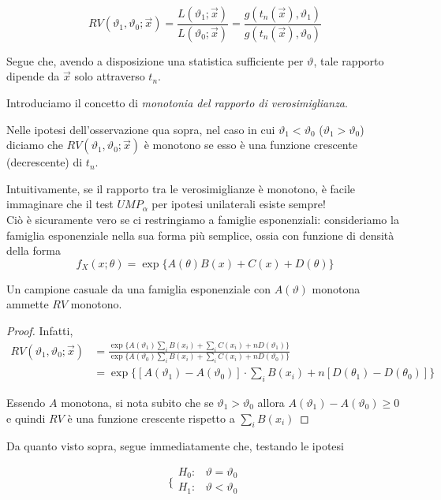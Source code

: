 $$RV(\vartheta_1,\vartheta_0; \vec{x}) = \frac{L(\vartheta_1;\vec{x})}{L(\vartheta_0;\vec{x})} = \frac{g(t_n(\vec{x}), \vartheta_1)}{g(t_n(\vec{x}), \vartheta_0)}$$

Segue che, avendo a disposizione una statistica sufficiente per $\vartheta$, tale rapporto dipende da $\vec{x}$ solo attraverso $t_n$.

Introduciamo il concetto di \textit{monotonia del rapporto di verosimiglianza}.

\begin{definizione}
Nelle ipotesi dell'osservazione qua sopra, nel caso in cui $\vartheta_1 < \vartheta_0$ ($\vartheta_1 > \vartheta_0$) diciamo che $RV(\vartheta_1,\vartheta_0; \vec{x})$ è monotono se esso è una funzione crescente (decrescente) di $t_n$. 
\end{definizione}

Intuitivamente, se il rapporto tra le verosimiglianze è monotono, è facile immaginare che il test $UMP_\alpha$ per ipotesi unilaterali esiste sempre!
\\
Ciò è sicuramente vero se ci restringiamo a famiglie esponenziali:
consideriamo la famiglia esponenziale nella sua forma più semplice, ossia con funzione di densità della forma
$$f_X(x;\theta) = \exp \{ A(\theta) B (x) +  C(x) +  D(\theta) \}$$

\begin{lemma}
Un campione casuale da una famiglia esponenziale con $A(\vartheta)$ monotona ammette $RV$ monotono.
\end{lemma}

\begin{proof}
Infatti, 
\begin{align*}
RV(\vartheta_1,\vartheta_0; \vec{x}) 
&= \frac{\exp \{ A(\vartheta_1) \sum_i B (x_i) + \sum_i C(x_i) +  n D(\vartheta_1) \}}{\exp \{  A(\vartheta_0) \sum_i B (x_i) +  \sum_i C(x_i) +  n D(\vartheta_0) \}}
\\&= \exp \{ [A(\vartheta_1) - A(\vartheta_0)] \cdot \sum_i B(x_i) + n[ D(\theta_1) -  D(\theta_0)] \}
\end{align*}

Essendo $A$ monotona, si nota subito che se $\vartheta_1 > \vartheta_0$ allora $A(\vartheta_1) - A(\vartheta_0)\geq 0$ e quindi $RV$ è una funzione crescente rispetto a $\sum_i B (x_i)$
\end{proof}

Da quanto visto sopra, segue immediatamente che, testando le ipotesi 

$$\bigg \{
\begin{array}{rl}
H_0: & \vartheta = \vartheta_0 \\
H_1: & \vartheta < \vartheta_0 \\
\end{array}
$$

